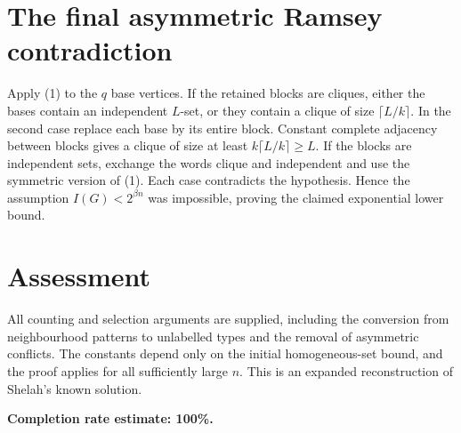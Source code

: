 \documentclass[11pt]{article}
\begin{document}
\section*{The final asymmetric Ramsey contradiction}
Apply (1) to the $q$ base vertices. If the retained blocks are cliques, either the bases contain an independent $L$-set, or they contain a clique of size $\lceil L/k\rceil$. In the second case replace each base by its entire block. Constant complete adjacency between blocks gives a clique of size at least $k\lceil L/k\rceil\ge L$. If the blocks are independent sets, exchange the words clique and independent and use the symmetric version of (1). Each case contradicts the hypothesis. Hence the assumption $I(G)<2^{\beta n}$ was impossible, proving the claimed exponential lower bound.

\section*{Assessment}
All counting and selection arguments are supplied, including the conversion from neighbourhood patterns to unlabelled types and the removal of asymmetric conflicts. The constants depend only on the initial homogeneous-set bound, and the proof applies for all sufficiently large $n$. This is an expanded reconstruction of Shelah's known solution.

\textbf{Completion rate estimate: 100\%.}
\end{document}
